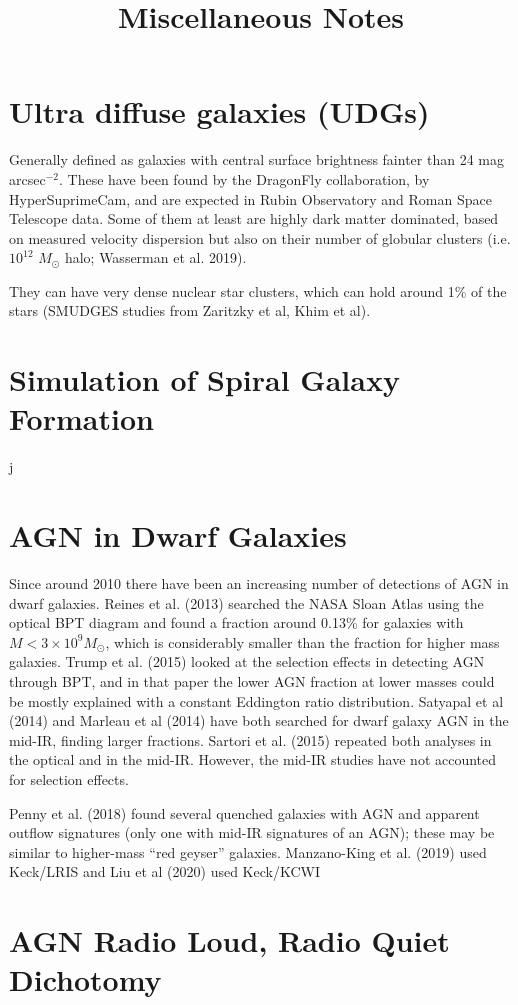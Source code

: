 \documentclass[11pt, preprint]{aastex}
\begin{document}
\title{\bf Miscellaneous Notes}

\section{Ultra diffuse galaxies (UDGs)}

Generally defined as galaxies with central surface brightness fainter
than 24 mag arcsec$^{-2}$. These have been found by the DragonFly
collaboration, by HyperSuprimeCam, and are expected in Rubin
Observatory and Roman Space Telescope data. Some of them at least are
highly dark matter dominated, based on measured velocity dispersion
but also on their number of globular clusters (i.e. $10^{12}$
$M_\odot$ halo; Wasserman et al. 2019).

They can have very dense nuclear star clusters, which can hold around
1\% of the stars (SMUDGES studies from Zaritzky et al, Khim et al).

\section{Simulation of Spiral Galaxy Formation}
j
\section{AGN in Dwarf Galaxies}

Since around 2010 there have been an increasing number of detections
of AGN in dwarf galaxies.  Reines et al. (2013) searched the NASA
Sloan Atlas using the optical BPT diagram and found a fraction around
0.13\% for galaxies with $M<3\times 10^9 M_\odot$, which is
considerably smaller than the fraction for higher mass galaxies.
Trump et al. (2015) looked at the selection effects in detecting AGN
through BPT, and in that paper the lower AGN fraction at lower masses
could be mostly explained with a constant Eddington ratio
distribution. Satyapal et al (2014) and Marleau et al (2014) have both
searched for dwarf galaxy AGN in the mid-IR, finding larger
fractions. Sartori et al. (2015) repeated both analyses in the optical
and in the mid-IR. However, the mid-IR studies have not accounted for
selection effects.

Penny et al. (2018) found several quenched galaxies with AGN and
apparent outflow signatures (only one with mid-IR signatures of an
AGN); these may be similar to higher-mass ``red geyser'' galaxies.
Manzano-King et al. (2019) used Keck/LRIS and Liu et al (2020) used
Keck/KCWI 

\section{AGN Radio Loud, Radio Quiet Dichotomy}
\end{document}
